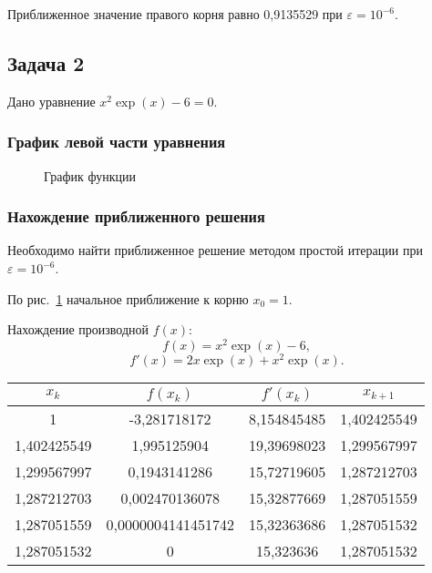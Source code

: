 \documentclass[10pt, a4paper, titlepage]{article}
\begin{document}
Приближенное значение правого корня равно 0,9135529 при $\varepsilon=10^{-6}$.

\subsection{Задача 2}

Дано уравнение $x^2\exp(x)-6=0$.

\subsubsection*{График левой части уравнения}
\begin{figure}[H]
    \centering
    \caption{График функции}
    \label{sr1Task2Function}
\end{figure}

\subsubsection*{Нахождение приближенного решения}

Необходимо найти приближенное решение методом простой итерации при $\varepsilon=10^{-6}$.

По рис.~\ref{sr1Task2Function} начальное приближение к корню $x_0=1$.

Нахождение производной $f(x)$: $$f(x)=x^2\exp(x)-6,$$ $$f'(x)=2x\exp(x)+x^2\exp(x).$$

\begin{center}
    \begin{tabular}{|c|c|c|c|}
        \hline
        $x_k$ & $f(x_k)$ & $f'(x_k)$ & $x_{k+1}$ \\ \hline
        
        1 & -3,281718172 & 8,154845485 & 1,402425549 \\ \hline
        
        1,402425549 & 1,995125904 & 19,39698023 & 1,299567997 \\ \hline
        
        1,299567997 & 0,1943141286 & 15,72719605 & 1,287212703 \\ \hline
        
        1,287212703 & 0,002470136078 & 15,32877669 & 1,287051559 \\ \hline
        
        1,287051559 & 0,0000004141451742 & 15,32363686 & 1,287051532 \\ \hline
        
        1,287051532 & 0 & 15,323636 & 1,287051532 \\ \hline
        
    \end{tabular}
\end{center}
\end{document}
